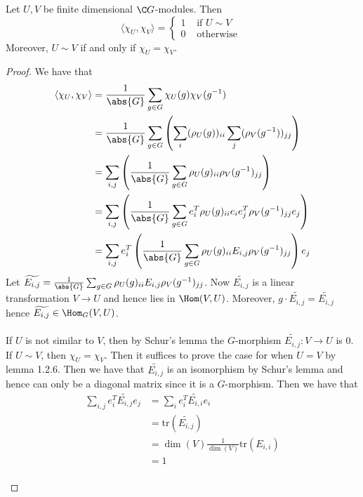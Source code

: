\documentclass[a4paper]{article}
\begin{document}
\begin{thm}{}{} Let $U,V$ be finite dimensional $\C G$-modules. Then $$\langle\chi_U,\chi_V\rangle=\begin{cases}
1 & \text{ if }U\sim V\\
0 & \text{ otherwise }
\end{cases}$$
Moreover, $U\sim V$ if and only if $\chi_U=\chi_V$. \tcbline
\begin{proof}
We have that 
\begin{align*}
\langle\chi_U,\chi_V\rangle&=\frac{1}{\abs{G}}\sum_{g\in G}\chi_U(g)\chi_V(g^{-1})\\
&=\frac{1}{\abs{G}}\sum_{g\in G}\left(\sum_i(\rho_U(g))_{ii}\sum_j(\rho_V(g^{-1}))_{jj}\right)\\
&=\sum_{i,j}\left(\frac{1}{\abs{G}}\sum_{g\in G}\rho_U(g)_{ii}\rho_V(g^{-1})_{jj}\right)\\
&=\sum_{i,j}\left(\frac{1}{\abs{G}}\sum_{g\in G}e_i^T\rho_U(g)_{ii}e_ie_j^T\rho_V(g^{-1})_{jj}e_j\right)\\
&=\sum_{i,j}e_i^T\left(\frac{1}{\abs{G}}\sum_{g\in G}\rho_U(g)_{ii}E_{i,j}\rho_V(g^{-1})_{jj}\right)e_j
\end{align*}
Let $\widetilde{E_{i,j}}=\frac{1}{\abs{G}}\sum_{g\in G}\rho_U(g)_{ii}E_{i,j}\rho_V(g^{-1})_{jj}$. Now $\widetilde{E_{i,j}}$ is a linear transformation $V\to U$ and hence lies in $\Hom(V,U)$. Moreover, $g\cdot\widetilde{E_{i,j}}=\widetilde{E_{i,j}}$ hence $\widetilde{E_{i,j}}\in\Hom_G(V,U)$. \\~\\

If $U$ is not similar to $V$, then by Schur's lemma the $G$-morphism $\widetilde{E_{i,j}}:V\to U$ is $0$. If $U\sim V$, then $\chi_U=\chi_V$. Then it suffices to prove the case for when $U=V$ by lemma 1.2.6. Then we have that $\widetilde{E_{i,j}}$ is an isomorphism by Schur's lemma and hence can only be a diagonal matrix since it is a $G$-morphism. Then we have that 
\begin{align*}
\sum_{i,j}e_i^T\widetilde{E_{i,j}}e_j&=\sum_ie_i^T\widetilde{E_{i,i}}e_i\\
&=\text{tr}(\widetilde{E_{i,j}})\\
&=\dim(V)\frac{1}{\dim(V)}\text{tr}(E_{i,i})\tag{2.3.2}\\
&=1
\end{align*}~\\


\end{proof}
\end{thm}
\end{document}
